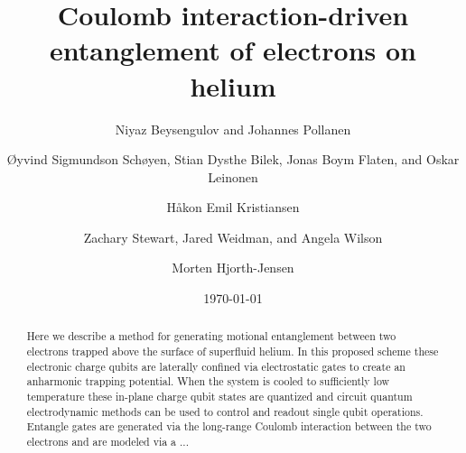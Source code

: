 \documentclass[twocolumn,superscriptaddress,unsortedaddress,
 amsmath,amssymb,
 aps,
]{revtex4-2}
\begin{document}

\title{Coulomb interaction-driven entanglement of electrons on helium}

\author{Niyaz Beysengulov and Johannes Pollanen}
\author{Øyvind Sigmundson Schøyen, Stian Dysthe Bilek, Jonas Boym Flaten, and Oskar Leinonen}
\author{Håkon Emil Kristiansen}
\author{Zachary Stewart, Jared Weidman, and Angela Wilson}
\author{Morten Hjorth-Jensen}
\begin{abstract}
  Here we describe a method for generating motional entanglement between two electrons trapped above the surface of superfluid helium. In this proposed scheme these electronic charge qubits are laterally confined via electrostatic gates to create an anharmonic trapping potential. When the system is cooled to sufficiently low temperature these in-plane charge qubit states are quantized and circuit quantum electrodynamic methods can be used to control and readout single qubit operations. Entangle gates are generated via the long-range Coulomb interaction between the two electrons and are modeled via a ...
\end{abstract}



\date{\today}%


\maketitle

\end{document}
